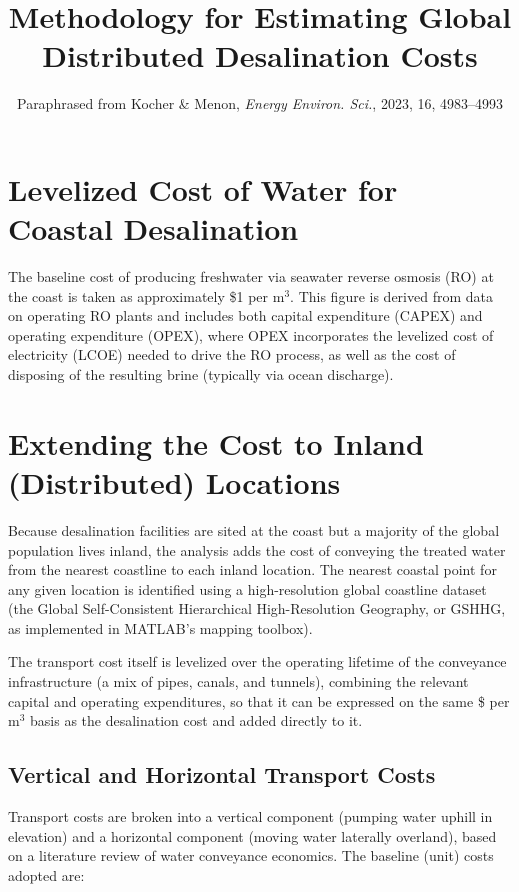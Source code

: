 \documentclass[11pt]{article}
\title{Methodology for Estimating Global Distributed Desalination Costs}
\author{Paraphrased from Kocher \& Menon, \emph{Energy Environ. Sci.}, 2023, 16, 4983--4993}
\date{}
\begin{document}
\maketitle

\section{Levelized Cost of Water for Coastal Desalination}

The baseline cost of producing freshwater via seawater reverse osmosis (RO) at
the coast is taken as approximately \$1 per m$^3$. This figure is derived from
data on operating RO plants and includes both capital expenditure (CAPEX) and
operating expenditure (OPEX), where OPEX incorporates the levelized cost of
electricity (LCOE) needed to drive the RO process, as well as the cost of
disposing of the resulting brine (typically via ocean discharge).

\section{Extending the Cost to Inland (Distributed) Locations}

Because desalination facilities are sited at the coast but a majority of the
global population lives inland, the analysis adds the cost of conveying the
treated water from the nearest coastline to each inland location. The nearest
coastal point for any given location is identified using a high-resolution
global coastline dataset (the Global Self-Consistent Hierarchical
High-Resolution Geography, or GSHHG, as implemented in MATLAB's mapping
toolbox).

The transport cost itself is levelized over the operating lifetime of the
conveyance infrastructure (a mix of pipes, canals, and tunnels), combining the
relevant capital and operating expenditures, so that it can be expressed on
the same \$ per m$^3$ basis as the desalination cost and added directly to it.

\subsection{Vertical and Horizontal Transport Costs}

Transport costs are broken into a vertical component (pumping water uphill in
elevation) and a horizontal component (moving water laterally overland),
based on a literature review of water conveyance economics. The baseline
(unit) costs adopted are:
\end{document}
